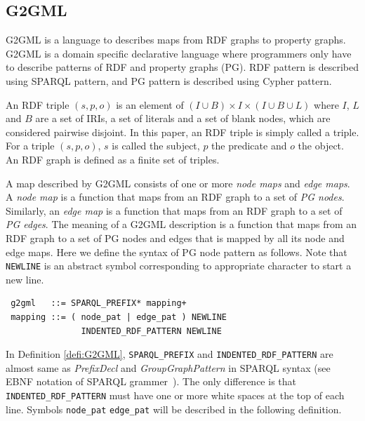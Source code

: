\documentclass[runningheads]{llncs}
\begin{document}
\subsection{G2GML}

G2GML is a language to describes maps from RDF graphs to property graphs. G2GML is a domain specific declarative language where programmers only have to describe patterns of RDF and property graphs (PG). RDF pattern is described using SPARQL pattern, and PG pattern is described using Cypher pattern.

\begin{prel}
An RDF triple $(s, p, o)$ is an element of $(I \cup B) \times I \times (I \cup B \cup L)$ where $I$, $L$ and $B$ are a set of IRIs, a set of literals and a set of blank nodes, which are considered pairwise disjoint. In this paper, an RDF triple is simply called a triple. For a triple $(s, p, o)$, $s$ is called the subject, $p$ the predicate and $o$ the object. An RDF graph is defined as a finite set of triples.
\end{prel}

\par
A map described by G2GML consists of one or more \textit{node maps} and \textit{edge maps}.
A \textit{node map} is a function that maps from an RDF graph to a set of \textit{PG nodes}. 
Similarly, an \textit{edge map} is a function that maps from an RDF graph to a set of \textit{PG edges}.
The meaning of a G2GML description is a function that maps from an RDF graph to a set of PG nodes and edges that is mapped by all its node and edge maps.
Here we define the syntax of PG node pattern as follows. 
Note that \texttt{NEWLINE} is an abstract symbol corresponding to appropriate character to start a new line. 

\begin{defi}
\label{defi:G2GML}
\leavevmode
\begin{verbatim}
 g2gml   ::= SPARQL_PREFIX* mapping+
 mapping ::= ( node_pat | edge_pat ) NEWLINE
               INDENTED_RDF_PATTERN NEWLINE
\end{verbatim}
\end{defi}
In Definition \ref{defi:G2GML}, \texttt{SPARQL\_PREFIX}
 and \texttt{INDENTED\_RDF\_PATTERN} are almost same as \textit{PrefixDecl} and \textit{GroupGraphPattern} in SPARQL syntax (see EBNF notation of SPARQL grammer~\cite{sparql}).
The only difference is that \texttt{INDENTED\_RDF\_PATTERN} must have one or more white spaces at the top of each line.
Symbols \texttt{node\_pat} \texttt{edge\_pat} will be described in the following definition.
\end{document}
